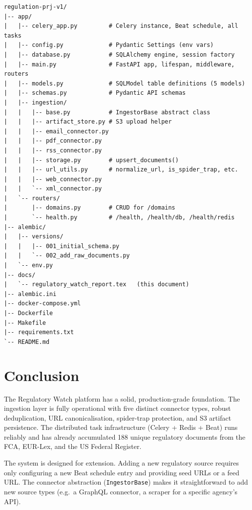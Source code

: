 \documentclass[12pt,a4paper]{article}
\begin{document}
\begin{lstlisting}[style=shellstyle, caption={Repository layout}]
regulation-prj-v1/
|-- app/
|   |-- celery_app.py         # Celery instance, Beat schedule, all tasks
|   |-- config.py             # Pydantic Settings (env vars)
|   |-- database.py           # SQLAlchemy engine, session factory
|   |-- main.py               # FastAPI app, lifespan, middleware, routers
|   |-- models.py             # SQLModel table definitions (5 models)
|   |-- schemas.py            # Pydantic API schemas
|   |-- ingestion/
|   |   |-- base.py           # IngestorBase abstract class
|   |   |-- artifact_store.py # S3 upload helper
|   |   |-- email_connector.py
|   |   |-- pdf_connector.py
|   |   |-- rss_connector.py
|   |   |-- storage.py        # upsert_documents()
|   |   |-- url_utils.py      # normalize_url, is_spider_trap, etc.
|   |   |-- web_connector.py
|   |   `-- xml_connector.py
|   `-- routers/
|       |-- domains.py        # CRUD for /domains
|       `-- health.py         # /health, /health/db, /health/redis
|-- alembic/
|   |-- versions/
|   |   |-- 001_initial_schema.py
|   |   `-- 002_add_raw_documents.py
|   `-- env.py
|-- docs/
|   `-- regulatory_watch_report.tex   (this document)
|-- alembic.ini
|-- docker-compose.yml
|-- Dockerfile
|-- Makefile
|-- requirements.txt
`-- README.md
\end{lstlisting}

\section{Conclusion}

The Regulatory Watch platform has a solid, production-grade foundation. The ingestion layer is fully operational with five distinct connector types, robust deduplication, URL canonicalisation, spider-trap protection, and S3 artifact persistence. The distributed task infrastructure (Celery + Redis + Beat) runs reliably and has already accumulated 188 unique regulatory documents from the FCA, EUR-Lex, and the US Federal Register.

The system is designed for extension. Adding a new regulatory source requires only configuring a new Beat schedule entry and providing seed URLs or a feed URL. The connector abstraction ({\tt IngestorBase}) makes it straightforward to add new source types (e.g.\ a GraphQL connector, a scraper for a specific agency's API).
\end{document}
